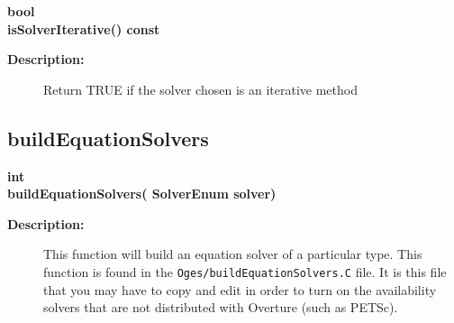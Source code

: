 \begin{flushleft} \textbf{%
bool  \\ 
\settowidth{\OgesParametersIncludeArgIndent}{isSolverIterative(}%
isSolverIterative() const
}\end{flushleft}
\begin{description}
\item[{\bf Description:}] 
   Return TRUE if the solver chosen is an iterative method
\end{description}
\subsection{buildEquationSolvers}
 
\begin{flushleft} \textbf{%
int  \\ 
\settowidth{\OgesParametersIncludeArgIndent}{buildEquationSolvers(}%
buildEquationSolvers( SolverEnum solver)
}\end{flushleft}
\begin{description}
\item[{\bf Description:}] 
    This function will build an equation solver of a particular type.
  This function is found in the {\tt Oges/buildEquationSolvers.C} file. It is this
 file that you may have to copy and edit in order to turn on the availability solvers
 that are not distributed with Overture (such as PETSc).
\end{description}
